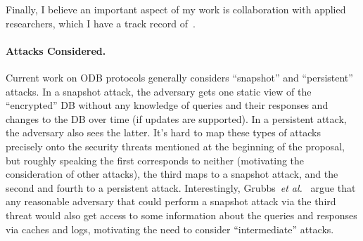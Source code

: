 Finally, I believe an important aspect of my work is collaboration with applied researchers, which I have a track record of~\cite{SIGMOD:MCOKC15,CCS:KKNO16,KKNO17,ZOSZ17}.


\iffalse

\paragraph*{Attacks Considered.} Current work on ODB protocols generally considers ``snapshot'' and ``persistent'' attacks.  In a snapshot attack, the adversary gets one static view of the ``encrypted'' DB without any knowledge of queries and their responses and changes to the DB over time (if updates are supported). In a persistent attack, the adversary also sees the latter.  It's hard to map these types of attacks precisely onto the security threats mentioned at the beginning of the proposal, but roughly speaking the first corresponds to neither (motivating the consideration of other attacks), the third maps to a snapshot attack, and the second and fourth to a persistent attack.        Interestingly, Grubbs~\emph{et al.}~\cite{Grubbs:2017} argue that  any reasonable adversary that could perform a snapshot attack via the third threat would also get access to some information about the queries and responses via caches and logs, motivating the need to consider ``intermediate'' attacks.

